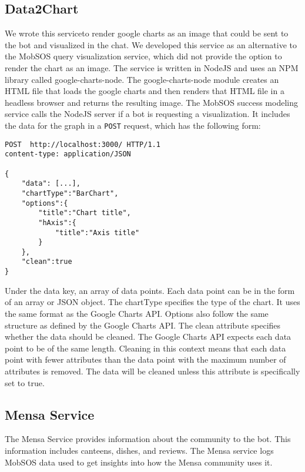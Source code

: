 \subsection{Data2Chart}
We wrote this service\footnotemark to render google charts as an image that could be sent to the bot and visualized in the chat. We developed this service as an alternative to the MobSOS query visualization service, which did not provide the option to render the chart as an image. 
The service is written in NodeJS and uses an NPM library called google-charts-node\footnotemark.
The google-charts-node module creates an HTML file that loads the google charts and then renders that HTML file in a headless browser \footnotemark and returns the resulting image.
The MobSOS success modeling service calls the NodeJS server if a bot is requesting a visualization. It includes the data for the graph in a \texttt{POST} request, which has the following form:
\begin{lstlisting}[caption=Structure of a request,captionpos=b]
POST  http://localhost:3000/ HTTP/1.1
content-type: application/JSON

{
    "data": [...],
    "chartType":"BarChart",
    "options":{
        "title":"Chart title",
        "hAxis":{
            "title":"Axis title"
        }
    },
    "clean":true 
}
\end{lstlisting}
Under the data key, an array of data points. Each data point can be in the form of an array or JSON object. 
The chartType specifies the type of the chart. It uses the same format as the Google Charts API. 
Options also follow the same structure as defined by the Google Charts API.
The clean attribute specifies whether the data should be cleaned. The Google Charts API expects each data point to be of the same length. Cleaning in this context means that each data point with fewer attributes than the data point with the maximum number of attributes is removed.
The data will be cleaned unless this attribute is specifically set to true.  

\subsection{Mensa Service}
The Mensa Service provides information about the community to the bot. This information includes canteens, dishes, and reviews. The Mensa service logs MobSOS data used to get insights into how the Mensa community uses it.

